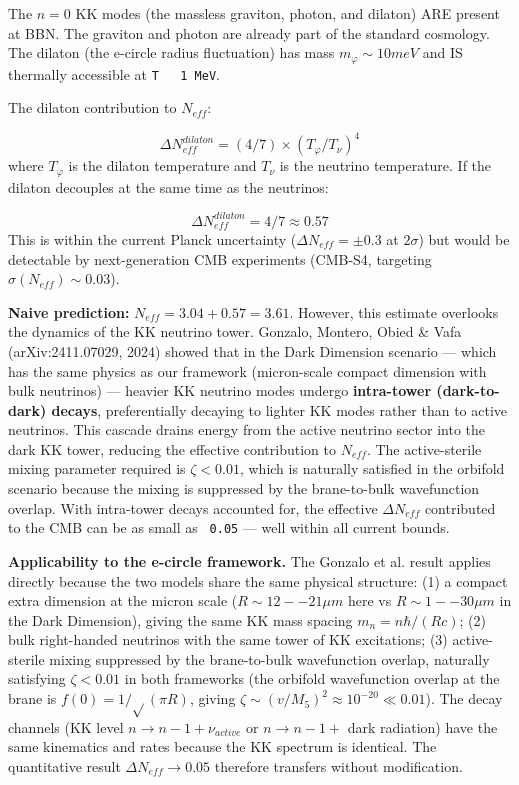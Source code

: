 \documentclass[aps,prd,preprint,superscriptaddress,longbibliography,floatfix]{revtex4-2}
\theoremstyle{remark}
\begin{document}
The $n = 0$ KK modes (the massless graviton, photon, and dilaton) ARE present at BBN. The graviton and photon are already part of the standard cosmology. The dilaton (the e-circle radius fluctuation) has mass $m_\varphi \sim  10 meV$ and IS thermally accessible at \texttt{T ~ 1 MeV}.

The dilaton contribution to $N_{eff}$:


\begin{equation}
    \Delta N_{eff}^{dilaton} = (4/7) \times (T_\varphi/T_\nu)^{4}
\end{equation}
where $T_\varphi$ is the dilaton temperature and $T_\nu$ is the neutrino temperature. If the dilaton decouples at the same time as the neutrinos:


\begin{equation}
    \Delta N_{eff}^{dilaton} = 4/7 \approx 0.57
\end{equation}
This is within the current Planck uncertainty ($\Delta N_{eff} = \pm0.3$ at $2\sigma$) but would be detectable by next-generation CMB experiments (CMB-S4, targeting $\sigma(N_{eff}) \sim  0.03$).

\textbf{Naive prediction:} $N_{eff} = 3.04 + 0.57 = 3.61$. However, this estimate overlooks the dynamics of the KK neutrino tower. Gonzalo, Montero, Obied \& Vafa (arXiv:2411.07029, 2024) showed that in the Dark Dimension scenario --- which has the same physics as our framework (micron-scale compact dimension with bulk neutrinos) --- heavier KK neutrino modes undergo \textbf{intra-tower (dark-to-dark) decays}, preferentially decaying to lighter KK modes rather than to active neutrinos. This cascade drains energy from the active neutrino sector into the dark KK tower, reducing the effective contribution to $N_{eff}$. The active-sterile mixing parameter required is $\zeta < 0.01$, which is naturally satisfied in the orbifold scenario because the mixing is suppressed by the brane-to-bulk wavefunction overlap. With intra-tower decays accounted for, the effective $\Delta N_{eff}$ contributed to the CMB can be as small as \texttt{~0.05} --- well within all current bounds.

\textbf{Applicability to the e-circle framework.} The Gonzalo et al. result applies directly because the two models share the same physical structure: (1) a compact extra dimension at the micron scale ($R \sim  12--21 \mu m$ here vs $R \sim  1--30 \mu m$ in the Dark Dimension), giving the same KK mass spacing $m_n = n\hbar/(Rc)$; (2) bulk right-handed neutrinos with the same tower of KK excitations; (3) active-sterile mixing suppressed by the brane-to-bulk wavefunction overlap, naturally satisfying $\zeta < 0.01$ in both frameworks (the orbifold wavefunction overlap at the brane is $f(0) = 1/\sqrt{}(\pi R)$, giving $\zeta \sim (v/M_{5})^{2} \approx 10^{-20} \ll 0.01$). The decay channels (KK level $n \to n-1 + \nu_{active}$ or $n \to n-1 +$ dark radiation) have the same kinematics and rates because the KK spectrum is identical. The quantitative result $\Delta N_{eff} \to 0.05$ therefore transfers without modification.
\end{document}
